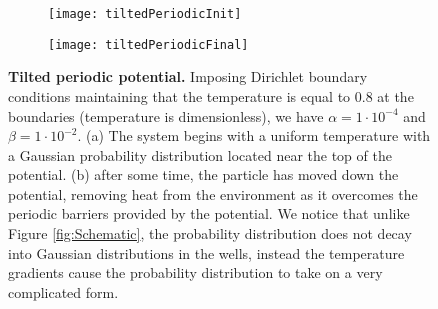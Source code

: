 \begin{figure}
	\begin{subfigure}{0.49\textwidth}
		\texttt{[image: tiltedPeriodicInit]}
	\end{subfigure}
	\begin{subfigure}{0.49\textwidth}
		\texttt{[image: tiltedPeriodicFinal]}
	\end{subfigure}
	\caption{\textbf{Tilted periodic potential.} Imposing Dirichlet boundary conditions maintaining that the temperature is equal to 0.8 at the boundaries (temperature is dimensionless), we have $\alpha = 1 \cdot 10^{-4}$ and $\beta = 1 \cdot 10^{-2}$. (a) The system begins with a uniform temperature with a Gaussian probability distribution located near the top of the potential. (b) after some time, the particle has moved down the potential, removing heat from the environment as it overcomes the periodic barriers provided by the potential. We notice that unlike Figure \ref{fig:Schematic}, the probability distribution does not decay into Gaussian distributions in the wells, instead the temperature gradients cause the probability distribution to take on a very complicated form. \label{fig:tiltedPeriodic}}
\end{figure}
